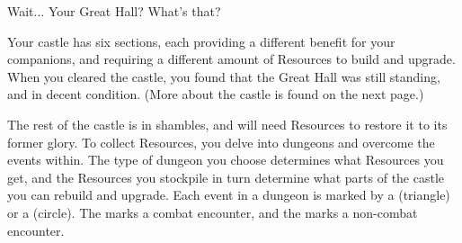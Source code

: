 Wait... Your Great Hall? What’s that?

\skipline

Your castle has six sections, each providing a different benefit for your companions, and requiring a different amount of Resources to build and upgrade. When you cleared the castle, you found that the Great Hall was still standing, and in decent condition. (More about the castle is found on the next page.)

\skipline

The rest of the castle is in shambles, and will need Resources to restore it to its former glory. 
To collect Resources, you delve into dungeons and overcome the events within. The type of dungeon you choose determines what Resources you get, and the Resources you stockpile in turn determine what parts of the castle you can rebuild and upgrade. Each event in a dungeon is marked by a \tripip  (triangle) or a \cirpip (circle). The \tripip marks a combat encounter, and the \cirpip marks a non-combat encounter.